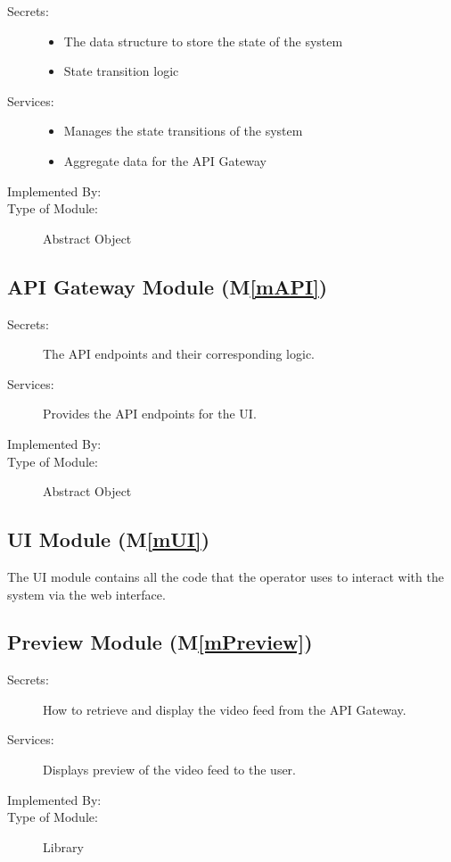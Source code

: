 \documentclass[12pt, titlepage]{article}
\newcommand{\mref}[1]{M\ref{#1}}
\begin{document}
\begin{description}
  \item[Secrets:] \leavevmode
        \begin{itemize}
          \item The data structure to store the state of the system
          \item State transition logic
        \end{itemize}
  \item[Services:] \leavevmode
        \begin{itemize}
          \item Manages the state transitions of the system
          \item Aggregate data for the API Gateway
        \end{itemize}
  \item[Implemented By:] \progname
  \item[Type of Module:] Abstract Object
\end{description}

\subsection{API Gateway Module (\mref{mAPI})}

\begin{description}
  \item[Secrets:] The API endpoints and their corresponding logic.
  \item[Services:] Provides the API endpoints for the UI.
  \item[Implemented By:] \progname
  \item[Type of Module:] Abstract Object
\end{description}

\subsection{UI Module (\mref{mUI})}

The UI module contains all the code that the operator uses to interact with the
system via the web interface.

\subsection{Preview Module (\mref{mPreview})}

\begin{description}
  \item[Secrets:] How to retrieve and display the video feed from the API Gateway.
  \item[Services:] Displays preview of the video feed to the user.
  \item[Implemented By:] \progname
  \item[Type of Module:] Library
\end{description}
\end{document}
